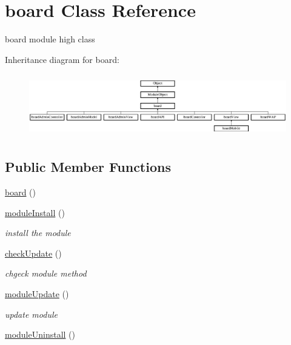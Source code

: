 \hypertarget{classboard}{}\section{board Class Reference}
\label{classboard}


board module high class  


Inheritance diagram for board\+:\begin{figure}[H]
\begin{center}
\leavevmode
\includegraphics[height=2.777778cm]{classboard}
\end{center}
\end{figure}
\subsection*{Public Member Functions}
\begin{DoxyCompactItemize}
\item 
\hyperlink{classboard_a2a97f34e7c9ed8ace6a2508bb2c6e2a2}{board} ()
\item 
\hyperlink{classboard_abcf015f709c0c2809dba55f74f059ebc}{module\+Install} ()
\begin{DoxyCompactList}\small\item\em install the module \end{DoxyCompactList}\item 
\hyperlink{classboard_a64506bb5293024e146d0ff7deeb27684}{check\+Update} ()
\begin{DoxyCompactList}\small\item\em chgeck module method \end{DoxyCompactList}\item 
\hyperlink{classboard_ab6b25ead0f4ec6d25f60338c7cdd33b5}{module\+Update} ()
\begin{DoxyCompactList}\small\item\em update module \end{DoxyCompactList}\item 
\hyperlink{classboard_a1e6008fcf4e2a540370e242246b8e721}{module\+Uninstall} ()
\end{DoxyCompactItemize}
